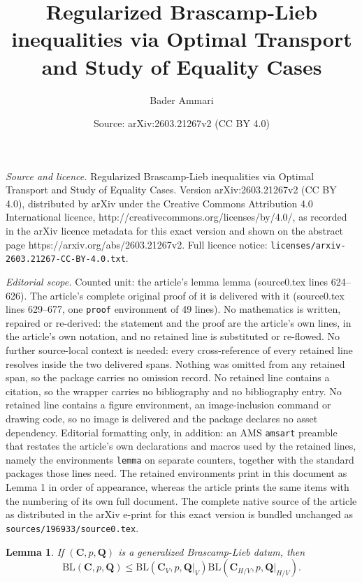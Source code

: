 \documentclass[10pt,a4paper]{amsart}
\title{Regularized Brascamp-Lieb inequalities via Optimal Transport and Study of Equality Cases}
\author{Bader Ammari}
\date{Source: arXiv:2603.21267v2 (CC BY 4.0)}
\newtheorem{lemma}{Lemma}
\begin{document}
\maketitle

\noindent\emph{Source and licence.} Regularized Brascamp-Lieb inequalities via Optimal Transport and Study of Equality Cases. Version arXiv:2603.21267v2 (CC BY 4.0), distributed by arXiv under the Creative Commons Attribution 4.0 International licence, http://creativecommons.org/licenses/by/4.0/, as recorded in the arXiv licence metadata for this exact version and shown on the abstract page https://arxiv.org/abs/2603.21267v2. Full licence notice: \texttt{licenses/arxiv-2603.21267-CC-BY-4.0.txt}.\par\smallskip

\noindent\textit{Editorial scope.} Counted unit: the article's lemma lemma (source0.tex lines 624--626). The article's complete original proof of it is delivered with it (source0.tex lines 629--677, one \texttt{proof} environment of 49 lines). No mathematics is written, repaired or re-derived: the statement and the proof are the article's own lines, in the article's own notation, and no retained line is substituted or re-flowed.  No further source-local context is needed: every cross-reference of every retained line resolves inside the two delivered spans.  Nothing was omitted from any retained span, so the package carries no omission record.  No retained line contains a citation, so the wrapper carries no bibliography and no bibliography entry.  No retained line contains a figure environment, an image-inclusion command or drawing code, so no image is delivered and the package declares no asset dependency.  Editorial formatting only, in addition: an AMS \texttt{amsart} preamble that restates the article's own declarations and macros used by the retained lines, namely the environments \texttt{lemma} on separate counters, together with the standard packages those lines need.  The retained environments print in this document as Lemma 1 in order of appearance, whereas the article prints the same items with the numbering of its own full document.  The complete native source of the article as distributed in the arXiv e-print for this exact version is bundled unchanged as \texttt{sources/196933/source0.tex}.
\begin{lemma}
    If $(\textbf{C},p,\textbf{Q})$ is a generalized Brascamp-Lieb datum, then $$\mathrm{BL}(\textbf{C},p,\textbf{Q}) \leq \mathrm{BL}(\textbf{C}_V,p,\textbf{Q}|_V)\mathrm{BL}(\textbf{C}_{H /V},p,\textbf{Q}|_{H/V}).$$
\end{lemma}
\end{document}
